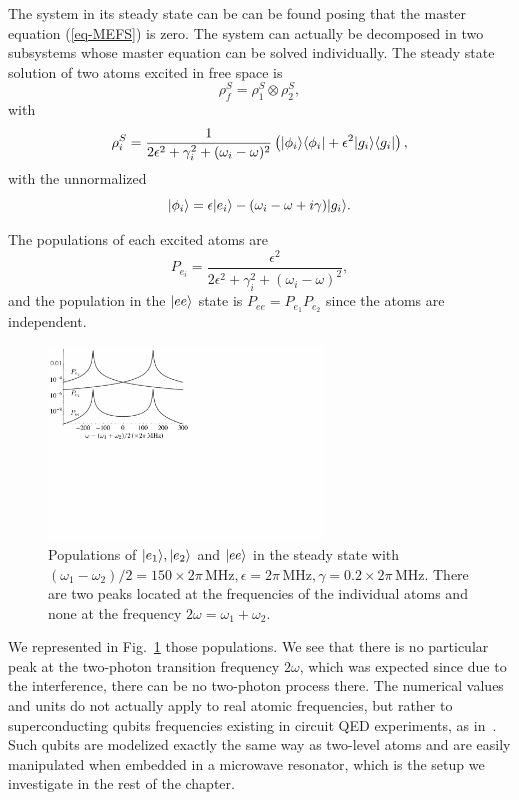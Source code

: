 The system in its steady state can be can be found posing that the master equation (\ref{eq-MEFS}) is zero. The system can actually be decomposed in two subsystems whose master equation can be solved individually. The steady state solution of two atoms excited in free space is
\[ \rho^S_f = \rho^S_1 \otimes \rho^S_2, \]
with
\[ \rho^S_i = \frac{1}{2\epsilon^2+ \gamma_i^2 + (\omega_i-\omega)^2} \left( | \phi_i \rangle \langle \phi_i | + \epsilon^2 | g_i \rangle \langle g_i |\right), \]
with the unnormalized
\[ | \phi_i \rangle = \epsilon | e_i \rangle - (\omega_i-\omega + i \gamma) | g_i \rangle.\]

The populations of each excited atoms are
\[ P_{e_i} =  \frac{\epsilon^2}{2\epsilon^2+ \gamma_i^2 + (\omega_i-\omega)^2} , \]
and the population in the $| ee \rangle$ state is $P_{ee}= P_{e_1}  P_{e_2}$ since the atoms are independent.

\begin{figure}
    \center
    \includegraphics[width=0.65\textwidth]{Images/chap5/free.pdf}
    \caption[Populations in the steady-state]{Populations of $| e_1 \rangle, | e_2 \rangle$ and $| ee \rangle$ in the steady state with $(\omega_1 - \omega_2)/2 = 150 \times 2\pi\,\mbox{MHz}, \epsilon=2\pi\,\mbox{MHz}, \gamma=0.2  \times 2\pi\,\mbox{MHz}$. There are two peaks located at the frequencies of the individual atoms and none at the frequency $2 \omega = \omega_1 + \omega_2$.}
    \label{fig-free}
\end{figure}

We represented in Fig.~\ref{fig-free} those populations. We see that there is no particular peak at the two-photon transition frequency $2\omega$, which was expected since due to the interference, there can be no two-photon process there. The numerical values and units do not actually apply to real atomic frequencies, but rather to superconducting qubits frequencies existing in circuit QED experiments, as in~\cite{Fin09}. Such qubits are modelized exactly the same way as two-level atoms and are easily manipulated when embedded in a microwave resonator, which is the setup we investigate in the rest of the chapter.

